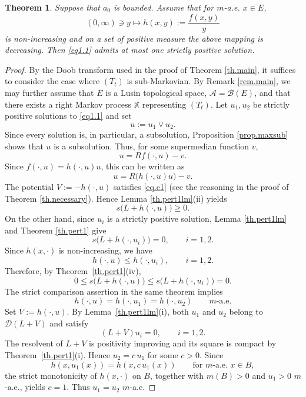 \documentclass[11pt,a4paper,reqno]{amsart}
\newtheorem{theorem}{\bf Theorem}[section]
\theoremstyle{definition}
\numberwithin{equation}{section}
\begin{document}
\begin{theorem}
Suppose that $a_0$ is bounded. Assume that  for $m$-a.e. $x\in E$,
\[
(0,\infty)\ni y\longmapsto h(x,y):=\frac{f(x,y)}{y}
\]
is  non-increasing and on a set of positive measure  the above mapping is decreasing.
Then \eqref{eq1.1} admits at most one strictly
positive solution.
\end{theorem}


\begin{proof}
By the Doob transform used in the proof of Theorem \ref{th.main}, it
suffices to consider the case where $(T_t)$ is sub-Markovian. 
By Remark \ref{rem.main}, we may further assume that $E$ is a Lusin
topological space, $\mathcal A=\mathcal B(E)$, and that there exists a right
Markov process $\mathbb X$ representing $(T_t)$.
Let $u_1,u_2$ be strictly positive solutions to \eqref{eq1.1} and set
\[
u:=u_1\vee u_2.
\]
Since every solution is, in particular, a subsolution, Proposition
\ref{prop.maxsub} shows that $u$ is a subsolution. Thus, for some
supermedian function $v$,
\[
u=Rf(\cdot,u)-v.
\]
Since $f(\cdot,u)=h(\cdot,u)u$, this can be written as
\[
u=R\bigl(h(\cdot,u)u\bigr)-v.
\]
The potential $V:=-h(\cdot,u)$ satisfies \eqref{eq.c1}
(see the reasoning in the proof of Theorem \ref{th.necessary}).
Hence Lemma \ref{th.pert1lm}(ii) yields
\begin{equation}
\label{eq.in167}
s\bigl(L+h(\cdot,u)\bigr)\ge0.
\end{equation}
On the other hand, since $u_i$ is a strictly positive solution,
Lemma \ref{th.pert1lm} and Theorem \ref{th.pert1} give
\[
s\bigl(L+h(\cdot,u_i)\bigr)=0,
\qquad i=1,2.
\]
Since $h(x,\cdot)$ is non-increasing, we have
\[
h(\cdot,u)\le h(\cdot,u_i),\qquad i=1,2.
\]
Therefore, by Theorem~\ref{th.pert1}(iv),
\[
0\le s\bigl(L+h(\cdot,u)\bigr)
\le s\bigl(L+h(\cdot,u_i)\bigr)=0.
\]
The strict comparison assertion in the same theorem implies
\[
h(\cdot,u)=h(\cdot,u_1)=h(\cdot,u_2)
\qquad m\text{-a.e.}
\]
Set $V:=h(\cdot,u)$. By Lemma~\ref{th.pert1lm}(i),
both $u_1$ and $u_2$ belong to $\mathscr D(L+V)$ and satisfy
\[
(L+V)u_i=0,\qquad i=1,2.
\]
The resolvent of $L+V$ is positivity improving and its square
is compact by Theorem~\ref{th.pert1}(i). Hence $u_2=c\,u_1$ for some $c>0$.
Since
\[
h(x,u_1(x))=h(x,c\,u_1(x))
\qquad\text{for }m\text{-a.e. }x\in B,
\]
the strict monotonicity of $h(x,\cdot)$ on $B$, together with
$m(B)>0$ and $u_1>0$ $m$-a.e., yields $c=1$.
Thus $u_1=u_2$ $m$-a.e.
\end{proof}
\end{document}
